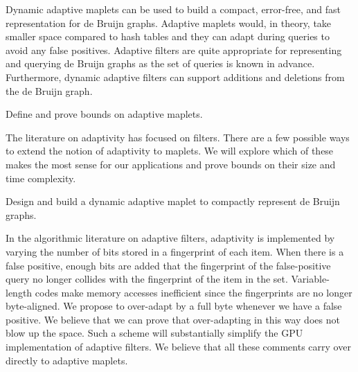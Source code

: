 Dynamic adaptive maplets can be used to build a compact, error-free, and fast representation for de Bruijn graphs. Adaptive maplets would, in theory, take smaller space compared to hash tables and they can adapt during queries to avoid any false positives. Adaptive filters are quite appropriate for representing and querying de Bruijn graphs as the set of queries is known in advance. Furthermore, dynamic adaptive filters can support \kmer additions and deletions from the de Bruijn graph.

\begin{rproblem}\label{rprob:adaptive-maplet}
Define and prove bounds on adaptive maplets.
\end{rproblem}
The literature on adaptivity has focused on filters.  There are a few possible ways to extend the notion of adaptivity to maplets.  We will explore which of these makes the most sense for our applications and prove bounds on their size and time complexity.

\begin{rproblem}\label{rprob:dyn-apt-filter}
Design and build a dynamic adaptive maplet to compactly represent de Bruijn graphs.
\end{rproblem}

In the algorithmic literature on adaptive filters, adaptivity is implemented by varying the number of bits stored in a fingerprint of each item.  When there is a false positive, enough bits are added that the fingerprint of the false-positive query no longer collides with the fingerprint of the item in the set.  Variable-length codes make memory accesses inefficient since the fingerprints are no longer byte-aligned.  We propose to over-adapt by a full byte whenever we have a false positive.  We believe that we can prove that over-adapting in this way does not blow up the space.  Such a scheme will substantially simplify the GPU implementation of adaptive filters.  We believe that all these comments carry over directly to adaptive maplets.





